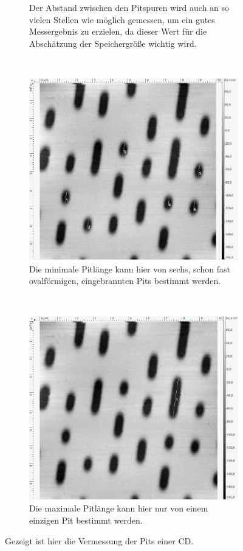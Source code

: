 \begin{figure}[H]
\begin{subfigure}[t]{0.4\textwidth}
	\caption{Der Abstand zwischen den Pitspuren wird auch an so vielen Stellen wie m\"oglich gemessen, um ein gutes Messergebnis zu erzielen, da dieser Wert f\"ur die Absch\"atzung der Speichergr\"o{\ss}e wichtig wird.}
	\label{abb:}
	\end{subfigure}
	\\
	\begin{subfigure}[t]{0.4\textwidth}
	\includegraphics[width=\textwidth]{AFM_auswertung/cd_Lmin.png}
	\caption{Die minimale Pitl\"ange kann hier von sechs, schon fast ovalf\"ormigen, eingebrannten Pits bestimmt werden.}
	\label{abb:}
	\end{subfigure}
	~
	\begin{subfigure}[t]{0.4\textwidth}
	\includegraphics[width=\textwidth]{AFM_auswertung/cd_Lmax.png}
	\caption{Die maximale Pitl\"ange kann hier nur von einem einzigen Pit bestimmt werden.}
	\label{abb:}
	\end{subfigure}
\caption{Gezeigt ist hier die Vermessung der Pits einer CD.}
\label{abb:CD}
\end{figure}
